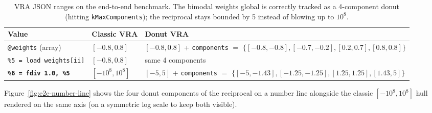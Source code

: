 \documentclass[11pt,a4paper]{article}
\theoremstyle{plain}
\begin{document}
\begin{table}[H]
\centering
\footnotesize
\begin{tabularx}{\linewidth}{@{}lXX@{}}
\toprule
Value & Classic VRA & Donut VRA \\
\midrule
\texttt{@weights} (array) & $[-0.8,0.8]$ &
  $[-0.8,0.8]$ + \texttt{components} $=$
  $\{[-0.8,-0.8],[-0.7,-0.2],[0.2,0.7],[0.8,0.8]\}$ \\[0.3em]
\texttt{\%5 = load weights[ii]} & $[-0.8,0.8]$ & same 4 components \\[0.3em]
\textbf{\texttt{\%6 = fdiv 1.0, \%5}} & \textbf{$[-10^8,10^8]$} &
  \textbf{$[-5,5]$} + \texttt{components} $=$
  $\{[-5,-1.43],[-1.25,-1.25],[1.25,1.25],[1.43,5]\}$ \\
\bottomrule
\end{tabularx}
\caption{VRA JSON ranges on the end-to-end benchmark. The bimodal
weights global is correctly tracked as a 4-component donut (hitting
\texttt{kMaxComponents}); the reciprocal stays bounded by 5 instead of
blowing up to $10^8$.}
\label{tab:e2e-vra}
\end{table}

Figure~\ref{fig:e2e-number-line} shows the four donut components of
the reciprocal on a number line alongside the classic
$[-10^8, 10^8]$ hull rendered on the same axis (on a symmetric log
scale to keep both visible).
\end{document}
